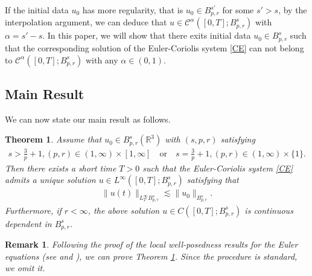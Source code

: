 \documentclass[12pt]{article}
\newtheorem{theorem}{Theorem}[section]
\newtheorem{remark}{Remark}[section]
\newcommand{\R}{\mathbb{R}}
\newcommand{\les}{\lesssim}
\begin{document}
If the initial data $u_0$ has more regularity, that is $u_0\in B^{s'}_{p,r}$ for some $s'>s$, by the interpolation argument, we can deduce that $u\in \mathcal{C}^\alpha([0,T];B^s_{p,r})$ with $\alpha=s'-s$.
In this paper, we will show that there exits initial data $u_0\in B^s_{p,r}$ such that the corresponding solution of the Euler-Coriolis system \eqref{CE} can not belong to $\mathcal{C}^\alpha([0,T];B^s_{p,r})$ with any $\alpha\in(0,1)$.



\subsection{Main Result}
We can now state our main result as follows.

\begin{theorem}\label{th1}
Assume that $u_0\in B^s_{p,r}(\R^3)$ with $(s,p,r)$ satisfying
\begin{align}\label{eq:spr1}
s>\frac{3}{p}+1, (p,r)\in (1,\infty)\times [1,\infty] \quad   \mathrm{or}    \quad s=\frac{3}{p}+1, (p,r)\in (1,\infty)\times\{1\}.
\end{align}
Then there exists a short time $T>0$ such that the Euler-Coriolis system \eqref{CE} admits a unique solution $u\in L^\infty([0,T];B^s_{p,r})$ satisfying that
\begin{align}\label{hx}
\|u(t)\|_{L^\infty_TB^s_{p,r}}\les\|u_0\|_{B^s_{p,r}}.
\end{align}
Furthermore, if $r<\infty$, the above solution $u\in C([0,T];B^s_{p,r})$ is continuous dependent in $B^s_{p,r}$.
\end{theorem}

\begin{remark}
Following the proof of the local well-posedness results for the Euler equations (see \cite[Theorem 7.1]{B} and \cite[Theorem 1.1]{GLY}), we can prove Theorem \ref{th1}. Since the procedure is standard, we omit it.
\end{remark}
\end{document}
